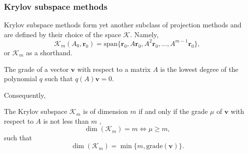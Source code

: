 \subsubsection{Krylov subspace methods}
Krylov subspace methods form yet another subclass of projection methods and are defined by their choice of the space $\mathcal{K}$. Namely,
\begin{equation}
  \mathcal{K}_m(A_0, \mathbf{r}_0) = \text{span}\{\mathbf{r}_0, A\mathbf{r}_0, A^2\mathbf{r}_0, \dots, A^{m-1}\mathbf{r}_0\},
  \label{eq:cg_krylov_space}
\end{equation}
or $\mathcal{K}_m$ as a shorthand. 
\begin{definition}
  The grade of a vector $\mathbf{v}$ with respect to a matrix $A$ is the lowest degree of the polynomial $q$ such that $q(A)\mathbf{v} = 0$.
  \label{def:cg_grade}
\end{definition}
Consequently,
\begin{theorem}
  The Krylov subspace $\mathcal{K}_m$ is of dimension $m$ if and only if the grade $\mu$ of $\mathbf{v}$ with respect to $A$ is not less than $m$ \cite[proposition 6.2]{iter_method_saad},
  \begin{equation*}
    \dim(\mathcal{K}_m) = m \iff \mu \geq m,
  \end{equation*}
  such that
  \begin{equation}
    \dim(\mathcal{K}_m) = \min \{m, \textrm{grade}(\mathbf{v})\}.
    \label{eq:cg_krylov_dimension}
  \end{equation}
  \label{th:cg_krylov_dimension}
\end{theorem}

